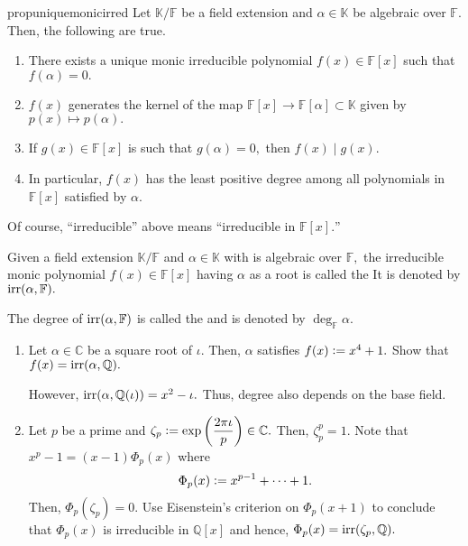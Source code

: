 \begin{restatable}[]{prop}{uniquemonicirred}
\label{prop:uniquemonicirred}
    Let $\mathbb{K}/\mathbb{F}$ be a field extension and $\alpha \in \mathbb{K}$ be algebraic over $\mathbb{F}.$ Then, the following are true. 
    \begin{enumerate}
        \item There exists a unique monic irreducible polynomial $f(x) \in \mathbb{F}[x]$ such that $f(\alpha) = 0.$ 
        \item $f(x)$ generates the kernel of the map $\mathbb{F}[x] \to \mathbb{F}[\alpha] \subset \mathbb{K}$ given by $p(x) \mapsto p(\alpha).$
        \item If $g(x) \in \mathbb{F}[x]$ is such that $g(\alpha) = 0,$ then $f(x) \mid g(x).$ 
        \item In particular, $f(x)$ has the least positive degree among all polynomials in $\mathbb{F}[x]$ satisfied by $\alpha.$ \hfill\hyperref[prop:uniquemonicirred2]{\downsym}
    \end{enumerate}

\end{restatable}

Of course, ``irreducible'' above means ``irreducible in $\mathbb{F}[x].$''

\begin{defn}%
    Given a field extension $\mathbb{K}/\mathbb{F}$ and $\alpha \in \mathbb{K}$ with is algebraic over $\mathbb{F},$ the irreducible monic polynomial $f(x) \in \mathbb{F}[x]$ having $\alpha$ as a root is called the  It is denoted by $\operatorname{irr}(\alpha, \mathbb{F}).$

    The degree of $\operatorname{irr}(\alpha, \mathbb{F})$ is called the  and is denoted by $\deg_{\mathbb{F}}\alpha.$
\end{defn}

\begin{ex}
    \phantom{hi}
    \begin{enumerate}
        \item Let $\alpha \in \mathbb{C}$ be a square root of $\iota.$ Then, $\alpha$ satisfies $f(x) \vcentcolon= x^4 + 1.$ Show that $f(x) = \operatorname{irr}(\alpha, \mathbb{Q}).$

        However, $\operatorname{irr}(\alpha, \mathbb{Q}(\iota)) = x^2 - \iota.$ Thus, degree also depends on the base field.
        \item Let $p$ be a prime and $\zeta_p \vcentcolon= \exp\left(\dfrac{2\pi\iota}{p}\right) \in \mathbb{C}.$ Then, $\zeta_p^p = 1.$ Note that $x^p - 1 = (x - 1)\Phi_p(x)$ where
        \begin{equation*} 
            \Phi_p(x) \vcentcolon= x^{p - 1} + \cdots + 1.
        \end{equation*}
        Then, $\Phi_p(\zeta_p) = 0.$ Use Eisenstein's criterion on $\Phi_p(x + 1)$ to conclude that $\Phi_p(x)$ is irreducible in $\mathbb{Q}[x]$ and hence, $\Phi_p(x) = \operatorname{irr}(\zeta_p, \mathbb{Q}).$
    \end{enumerate}
\end{ex}


